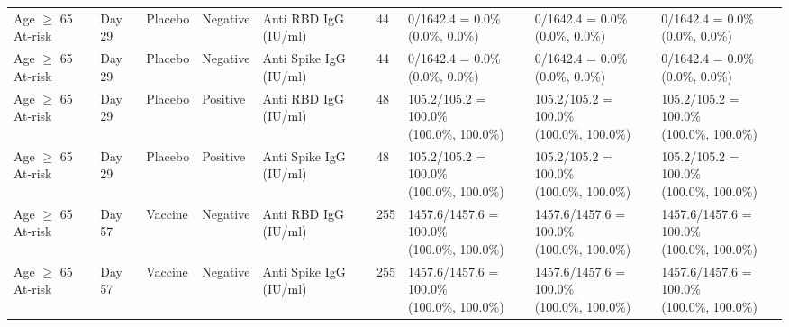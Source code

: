 \documentclass[]{book}
\theoremstyle{definition}
\theoremstyle{definition}
\theoremstyle{definition}
\newcommand{\1}{\mathbbm{1}}
\begin{document}
\begin{landscape}
\begin{ThreePartTable}
\begin{longtable}[t]{>{\raggedright\arraybackslash}p{2.7cm}llllllll}
\hspace{1em}Age $\geq$ 65 At-risk & Day 29 & Placebo & Negative & Anti RBD IgG (IU/ml) & 44 & \makecell[l]{0/1642.4 = 0.0\%\\(0.0\%, 0.0\%)} & \makecell[l]{0/1642.4 = 0.0\%\\(0.0\%, 0.0\%)} & \makecell[l]{0/1642.4 = 0.0\%\\(0.0\%, 0.0\%)}\\
\hspace{1em}Age $\geq$ 65 At-risk & Day 29 & Placebo & Negative & Anti Spike IgG (IU/ml) & 44 & \makecell[l]{0/1642.4 = 0.0\%\\(0.0\%, 0.0\%)} & \makecell[l]{0/1642.4 = 0.0\%\\(0.0\%, 0.0\%)} & \makecell[l]{0/1642.4 = 0.0\%\\(0.0\%, 0.0\%)}\\
\hspace{1em}Age $\geq$ 65 At-risk & Day 29 & Placebo & Positive & Anti RBD IgG (IU/ml) & 48 & \makecell[l]{105.2/105.2 = 100.0\%\\(100.0\%, 100.0\%)} & \makecell[l]{105.2/105.2 = 100.0\%\\(100.0\%, 100.0\%)} & \makecell[l]{105.2/105.2 = 100.0\%\\(100.0\%, 100.0\%)}\\
\hspace{1em}Age $\geq$ 65 At-risk & Day 29 & Placebo & Positive & Anti Spike IgG (IU/ml) & 48 & \makecell[l]{105.2/105.2 = 100.0\%\\(100.0\%, 100.0\%)} & \makecell[l]{105.2/105.2 = 100.0\%\\(100.0\%, 100.0\%)} & \makecell[l]{105.2/105.2 = 100.0\%\\(100.0\%, 100.0\%)}\\
\hspace{1em}Age $\geq$ 65 At-risk & Day 57 & Vaccine & Negative & Anti RBD IgG (IU/ml) & 255 & \makecell[l]{1457.6/1457.6 = 100.0\%\\(100.0\%, 100.0\%)} & \makecell[l]{1457.6/1457.6 = 100.0\%\\(100.0\%, 100.0\%)} & \makecell[l]{1457.6/1457.6 = 100.0\%\\(100.0\%, 100.0\%)}\\
\hspace{1em}Age $\geq$ 65 At-risk & Day 57 & Vaccine & Negative & Anti Spike IgG (IU/ml) & 255 & \makecell[l]{1457.6/1457.6 = 100.0\%\\(100.0\%, 100.0\%)} & \makecell[l]{1457.6/1457.6 = 100.0\%\\(100.0\%, 100.0\%)} & \makecell[l]{1457.6/1457.6 = 100.0\%\\(100.0\%, 100.0\%)}\\

\end{longtable}
\end{ThreePartTable}
\end{landscape}
\end{document}
